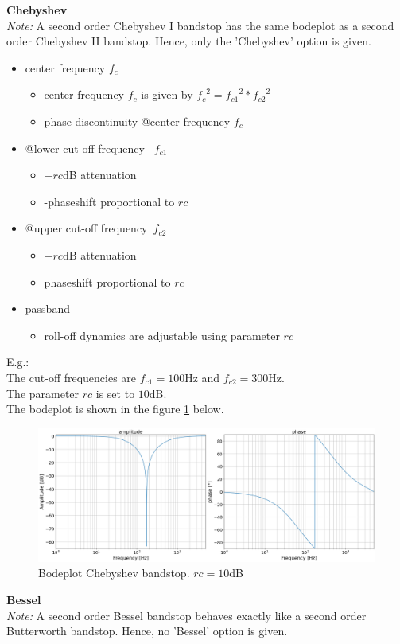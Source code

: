 \textbf{Chebyshev}\\
\emph{Note:} A second order Chebyshev I bandstop has the same bodeplot as a second order Chebyshev II bandstop. Hence, only the 'Chebyshev' option is given.\\
\begin{itemize}
    \item center frequency $f_c$
    \begin{itemize}
        \item center frequency $f_c$ is given by ${f_c}^2={f_{c1}}^2*{f_{c2}}^2$
		\item phase discontinuity @center frequency $f_c$
    \end{itemize}
    \item @lower cut-off frequency~ $f_{c1}$
    \begin{itemize}
        \item $-rc$dB attenuation
        \item -phaseshift proportional to $rc$
    \end{itemize}
	\item @upper cut-off frequency~$f_{c2}$
    \begin{itemize}
        \item $-rc$dB attenuation
        \item phaseshift proportional to $rc$
    \end{itemize}
    \item passband 
    \begin{itemize}
		\item roll-off dynamics are adjustable using parameter $rc$
    \end{itemize} 
\end{itemize}


E.g.: \\
The cut-off frequencies are $f_{c1}=100$Hz and $f_{c2}=300$Hz.\\
The parameter $rc$ is set to $10$dB.\\
The bodeplot is shown in the figure \ref{fig:bs_cheby1} below.
\begin{figure}[h!]
  \centering
  \includegraphics[width=.75\linewidth]{bs_cheby1.png}
  \caption{Bodeplot Chebyshev bandstop. $rc=10$dB}
  \label{fig:bs_cheby1}
\end{figure}

\textbf{Bessel}\\
\emph{Note:} A second order Bessel bandstop behaves exactly like a second order Butterworth bandstop. Hence, no 'Bessel' option is given.